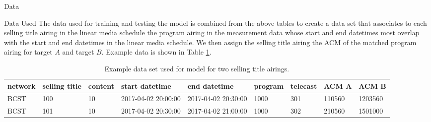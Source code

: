\begin{chapter}{Data}
\begin{section}{Data Used}
  The data used for training and testing the model is combined from the above tables to create a
  data set that associates to each selling title airing in the linear media schedule the program airing in the measurement data whose start and end datetimes
  most overlap with the start and end datetimes in the linear media schedule. We then assign
  the selling title airing the ACM of the matched program airing for target $A$ and target $B$.
  Example data is shown in Table \ref{tab:data}.

  \begin{table}[h!]
    \centering
    \begin{adjustbox}{width=1.1\textwidth,center=\textwidth}
      \large
      \begin{tabular}{lllllllll}
        network & selling title & content & start datetime & end datetime & program & telecast & ACM A & ACM B\\
        \hline
        BCST & 100 & 10 & 2017-04-02 20:00:00 & 2017-04-02 20:30:00 & 1000 & 301 & 110560 & 1203560\\
        BCST & 101 & 10 & 2017-04-02 20:30:00 & 2017-04-02 21:00:00 & 1000 & 302 & 210560 & 1501000\\
      \end{tabular}
    \end{adjustbox}
    \caption{Example data set used for model for two selling title airings.}\label{tab:data}
  \end{table}


\end{section}

\end{chapter}